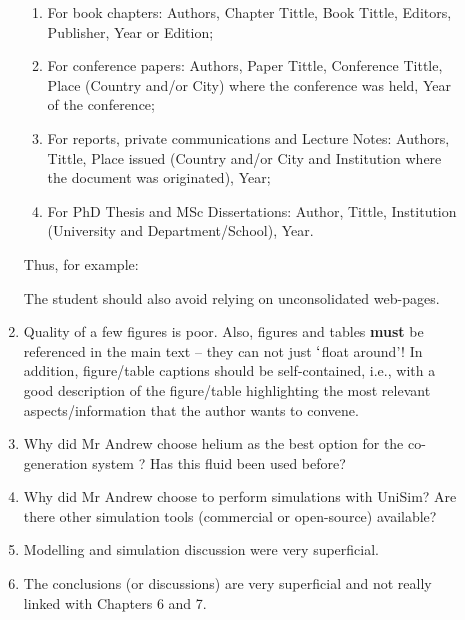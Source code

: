 \documentclass[14pt,twoside]{report}
\begin{document}
\begin{description}
\begin{enumerate}
\begin{enumerate}
\item For book chapters: Authors, Chapter Tittle, Book Tittle, Editors, Publisher, Year or Edition;
\item For conference papers: Authors, Paper Tittle, Conference Tittle, Place (Country and/or City) where the conference was held, Year of the conference;
\item For reports,  private communications and Lecture Notes: Authors, Tittle, Place issued (Country and/or City and Institution where the document was originated), Year;
\item For PhD Thesis and MSc Dissertations: Author, Tittle, Institution (University and Department/School), Year.
\end{enumerate}  
Thus, for example:
The student should also avoid relying on unconsolidated web-pages.
%
\item Quality of a few figures is poor. Also, figures and tables {\bf must} be referenced in the main text -- they can not just $\lq$float around'! In addition, figure/table captions should be self-contained, i.e., with a good description of the figure/table highlighting the most relevant aspects/information that the author wants to convene. 
% 
\item Why did Mr Andrew choose helium as the best option for the co-generation system ? Has this fluid been used before?
%
\item Why did Mr Andrew choose to perform simulations with UniSim? Are there other simulation tools (commercial or open-source) available?
%
\item Modelling and simulation discussion were very superficial.
%
\item The conclusions (or discussions) are very superficial and not really linked with Chapters 6 and 7. 
%
\end{enumerate}


\end{description}
\end{document}
